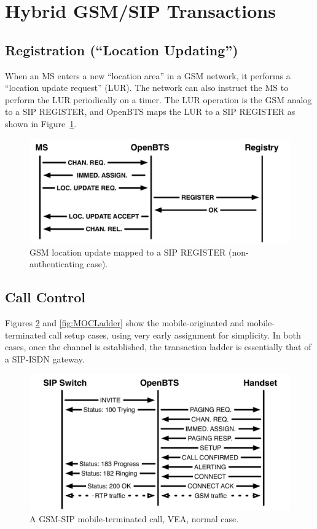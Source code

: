 \documentclass[11pt,openany]{book}
\begin{document}
\section{Hybrid GSM/SIP Transactions}

\subsection{Registration (``Location Updating'')}
\label{sec:GSMLUR}
When an MS enters a new ``location area'' in a GSM network, it performs a ``location update request'' (LUR).  The network can also instruct the MS to perform the LUR periodically on a timer.
The LUR operation is the GSM analog to a SIP REGISTER, and OpenBTS maps the LUR to a SIP REGISTER as shown in Figure~\ref{fig:LURLadder}.

\begin{figure}[htbp]
\begin{center}
\includegraphics[width=6in]{LURLadder.pdf}
\caption{GSM location update mapped to a SIP REGISTER (non-authenticating case).}
\label{fig:LURLadder}
\end{center}
\end{figure}



\subsection{Call Control}
Figures \ref{fig:MTCLadder} and \ref{fig:MOCLadder} show the mobile-originated and mobile-terminated call setup cases, using very early assignment for simplicity.  In both cases, once the channel is established, the transaction ladder is essentially that of a SIP-ISDN gateway.

\begin{figure}[htbp]
\begin{center}
\includegraphics[width=6in]{MTCLadder.pdf}
\caption{A GSM-SIP mobile-terminated call, VEA, normal case.}
\label{fig:MTCLadder}
\end{center}
\end{figure}
\end{document}

